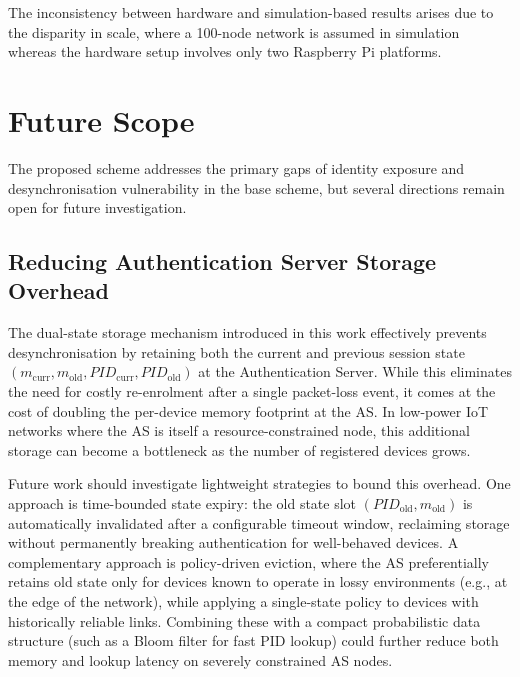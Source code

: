 \documentclass[12pt,a4paper]{report}
\begin{document}
The inconsistency between hardware and simulation-based results arises due to the
disparity in scale, where a 100-node network is assumed in simulation whereas the
hardware setup involves only two Raspberry Pi platforms.

\chapter{Future Scope}

The proposed scheme addresses the primary gaps of identity exposure and
desynchronisation vulnerability in the base scheme, but several directions remain
open for future investigation.

\section{Reducing Authentication Server Storage Overhead}

The dual-state storage mechanism introduced in this work effectively prevents
desynchronisation by retaining both the current and previous session state
$(m_{\mathrm{curr}}, m_{\mathrm{old}}, \mathit{PID}_{\mathrm{curr}},
\mathit{PID}_{\mathrm{old}})$ at the Authentication Server.
While this eliminates the need for costly re-enrolment after a single
packet-loss event, it comes at the cost of doubling the per-device memory
footprint at the AS.
In low-power IoT networks where the AS is itself a resource-constrained node,
this additional storage can become a bottleneck as the number of registered
devices grows.

Future work should investigate lightweight strategies to bound this overhead.
One approach is time-bounded state expiry: the old state slot
$(\mathit{PID}_{\mathrm{old}}, m_{\mathrm{old}})$ is automatically invalidated
after a configurable timeout window, reclaiming storage without permanently
breaking authentication for well-behaved devices.
A complementary approach is policy-driven eviction, where the AS preferentially
retains old state only for devices known to operate in lossy environments
(e.g., at the edge of the network), while applying a single-state policy to
devices with historically reliable links.
Combining these with a compact probabilistic data structure (such as a Bloom
filter for fast PID lookup) could further reduce both memory and lookup latency
on severely constrained AS nodes.
\end{document}
